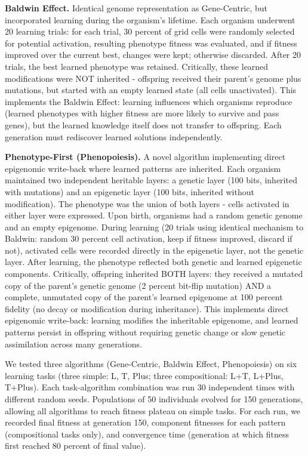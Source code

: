 \documentclass[11pt]{article}
\begin{document}
\textbf{Baldwin Effect.} Identical genome representation as Gene-Centric, but incorporated learning during the organism's lifetime. Each organism underwent 20 learning trials: for each trial, 30 percent of grid cells were randomly selected for potential activation, resulting phenotype fitness was evaluated, and if fitness improved over the current best, changes were kept; otherwise discarded. After 20 trials, the best learned phenotype was retained. Critically, these learned modifications were NOT inherited - offspring received their parent's genome plus mutations, but started with an empty learned state (all cells unactivated). This implements the Baldwin Effect: learning influences which organisms reproduce (learned phenotypes with higher fitness are more likely to survive and pass genes), but the learned knowledge itself does not transfer to offspring. Each generation must rediscover learned solutions independently.

\textbf{Phenotype-First (Phenopoiesis).} A novel algorithm implementing direct epigenomic write-back where learned patterns are inherited. Each organism maintained two independent heritable layers: a genetic layer (100 bits, inherited with mutations) and an epigenetic layer (100 bits, inherited without modification). The phenotype was the union of both layers - cells activated in either layer were expressed. Upon birth, organisms had a random genetic genome and an empty epigenome. During learning (20 trials using identical mechanism to Baldwin: random 30 percent cell activation, keep if fitness improved, discard if not), activated cells were recorded directly in the epigenetic layer, not the genetic layer. After learning, the phenotype reflected both genetic and learned epigenetic components. Critically, offspring inherited BOTH layers: they received a mutated copy of the parent's genetic genome (2 percent bit-flip mutation) AND a complete, unmutated copy of the parent's learned epigenome at 100 percent fidelity (no decay or modification during inheritance). This implements direct epigenomic write-back: learning modifies the inheritable epigenome, and learned patterns persist in offspring without requiring genetic change or slow genetic assimilation across many generations.


We tested three algorithms (Gene-Centric, Baldwin Effect, Phenopoiesis) on six learning tasks (three simple: L, T, Plus; three compositional: L+T, L+Plus, T+Plus). Each task-algorithm combination was run 30 independent times with different random seeds. Populations of 50 individuals evolved for 150 generations, allowing all algorithms to reach fitness plateau on simple tasks. For each run, we recorded final fitness at generation 150, component fitnesses for each pattern (compositional tasks only), and convergence time (generation at which fitness first reached 80 percent of final value).
\end{document}
